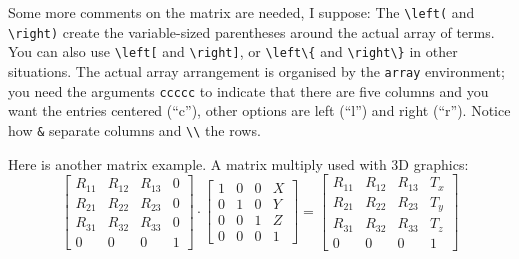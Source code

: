 Some more comments on the matrix are needed, I suppose:
The \verb+\left(+ and \verb+\right)+ create the variable-sized parentheses
around the actual array of terms. You can also use \verb+\left[+ and
\verb+\right]+, or \verb+\left\{+ and \verb+\right\}+ in other situations.
The actual array arrangement is organised by the \verb+array+ environment;
you need the arguments \verb+ccccc+ to indicate that there are five columns
and you want the entries centered (``c''), other options are left (``l'')
and right (``r''). Notice how \verb+&+ separate columns and \verb+\\+
the rows.

Here is another matrix example.
A matrix multiply used with 3D graphics:
\begin{displaymath}
  \left[ \begin{array}{cccc}
        R_{11} & R_{12} & R_{13} & 0 \\
        R_{21} & R_{22} & R_{23} & 0 \\
        R_{31} & R_{32} & R_{33} & 0 \\
        0      & 0      & 0       & 1
    \end{array} \right]
  \cdot
  \left[ \begin{array}{cccc}
      1 & 0 & 0 & X \\
      0 & 1 & 0 & Y \\
      0 & 0 & 1 & Z \\
      0 & 0 & 0 & 1
  \end{array} \right] 
=  \left[ \begin{array}{cccc}
        R_{11} & R_{12} & R_{13} & T_x \\
        R_{21} & R_{22} & R_{23} & T_y \\
        R_{31} & R_{32} & R_{33} & T_z \\
        0      & 0      & 0       & 1
  \end{array} \right] 
\end{displaymath}


